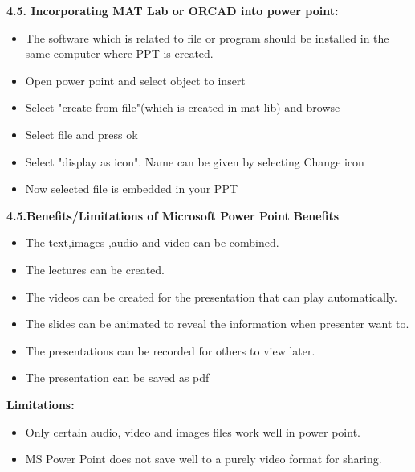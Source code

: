 \textbf{4.5. Incorporating MAT Lab or ORCAD into power point:}
\begin{itemize}
  \item The software which is related to file or program should be installed in the same computer where PPT is created.
  \item Open power point and select object to insert
  \item Select "create from file"(which is created in mat lib) and browse
  \item Select  file and press ok
  \item Select "display as icon". Name can be given by selecting Change icon
  \item Now  selected file is embedded in your  PPT
\end{itemize}

\textbf{4.5.Benefits/Limitations of Microsoft Power Point}
\textbf{Benefits}
\begin{itemize}
  \item The text,images ,audio and video can be combined.
  \item The lectures can be created.
  \item The videos can be created for the presentation that can play automatically.
  \item The slides can be animated to reveal the information when presenter want to.
  \item The presentations can be recorded for others to  view later.
  \item The presentation can be saved as pdf
\end{itemize}
	

\textbf{Limitations:}
\begin{itemize}
  \item Only certain audio, video and images files work well in power point.
  \item MS Power Point does not save well to a purely video format for sharing.
\end{itemize}


